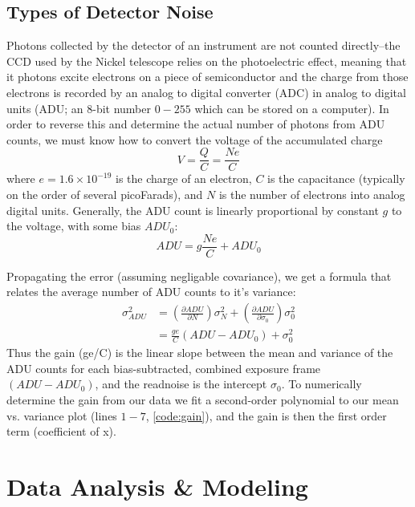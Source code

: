 \documentclass[preprint]{aastex62}
\begin{document}
\subsection{Types of Detector Noise} \label{subsec:noise}
Photons collected by the detector of an instrument are not counted directly--the CCD used by the Nickel telescope relies on the photoelectric effect, meaning that it photons excite electrons on a piece of semiconductor and the charge from those electrons is recorded by an analog to digital converter (ADC) in analog to digital units (ADU; an 8-bit number $0-255$ which can be stored on a computer). In order to reverse this and determine the actual number of photons from ADU counts, we must know how to convert the voltage of the accumulated charge 
\begin{equation}
V = \frac{Q}{C} = \frac{Ne}{C}
\end{equation}
where $e=1.6\times10^{-19}$ is the charge of an electron, $C$ is the capacitance (typically on the order of several picoFarads), and $N$ is the number of electrons into analog digital units. Generally, the ADU count is linearly proportional by constant $g$ to the voltage, with some bias $ADU_0$:
\begin{equation}
ADU = g\frac{Ne}{C} + ADU_0
\end{equation}

Propagating the error (assuming negligable covariance), we get a formula that relates the average number of ADU counts to it's variance:
\begin{align}
\sigma_{ADU}^2 &= \left(\frac{\partial ADU}{\partial N} \right) \sigma_N^2 + 
    \left(\frac{\partial ADU}{\partial \sigma_0} \right) \sigma_0^2 \\
    &= \frac{ge}{C} \left(ADU - ADU_0 \right) + \sigma_0^2
\end{align}
Thus the gain (ge/C) is the linear slope between the mean and variance of the ADU counts for each bias-subtracted, combined exposure frame $\left(ADU - ADU_0 \right)$, and the readnoise is the intercept $\sigma_0$. To numerically determine the gain from our data we fit a second-order polynomial to our mean vs. variance plot (lines $1-7$, \ref{code:gain}), and the gain is then the first order term (coefficient of x).

\section{Data Analysis \& Modeling} \label{sec:analysis}
\end{document}
